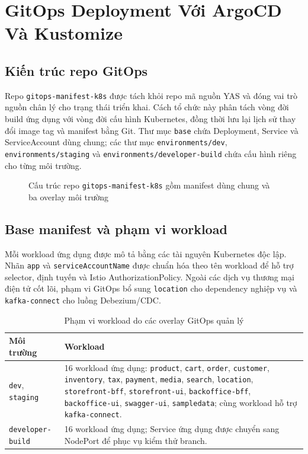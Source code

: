 \section{GitOps Deployment Với ArgoCD Và Kustomize}
\label{sec:gitops}

\subsection{Kiến trúc repo GitOps}

Repo \texttt{gitops-manifest-k8s} được tách khỏi repo mã nguồn YAS và đóng vai trò nguồn chân lý cho trạng thái triển khai. Cách tổ chức này phân tách vòng đời build ứng dụng với vòng đời cấu hình Kubernetes, đồng thời lưu lại lịch sử thay đổi image tag và manifest bằng Git. Thư mục \texttt{base} chứa Deployment, Service và ServiceAccount dùng chung; các thư mục \texttt{environments/dev}, \texttt{environments/staging} và \texttt{environments/developer-build} chứa cấu hình riêng cho từng môi trường.

\begin{figure}[H]
\centering
{}
\caption{Cấu trúc repo \texttt{gitops-manifest-k8s} gồm manifest dùng chung và ba overlay môi trường}
\end{figure}

\subsection{Base manifest và phạm vi workload}

Mỗi workload ứng dụng được mô tả bằng các tài nguyên Kubernetes độc lập. Nhãn \texttt{app} và \texttt{serviceAccountName} được chuẩn hóa theo tên workload để hỗ trợ selector, định tuyến và Istio AuthorizationPolicy. Ngoài các dịch vụ thương mại điện tử cốt lõi, phạm vi GitOps bổ sung \texttt{location} cho dependency nghiệp vụ và \texttt{kafka-connect} cho luồng Debezium/CDC.

\begin{table}[H]
\centering
\caption{Phạm vi workload do các overlay GitOps quản lý}
\begin{tabular}{|p{}|p{}|}
\hline
\textbf{Môi trường} & \textbf{Workload} \\
\hline
\texttt{dev}, \texttt{staging} &
16 workload ứng dụng: \texttt{product}, \texttt{cart}, \texttt{order},
\texttt{customer}, \texttt{inventory}, \texttt{tax}, \texttt{payment},
\texttt{media}, \texttt{search}, \texttt{location}, \texttt{storefront-bff},
\texttt{storefront-ui}, \texttt{backoffice-bff}, \texttt{backoffice-ui},
\texttt{swagger-ui}, \texttt{sampledata}; cùng workload hỗ trợ
\texttt{kafka-connect}. \\
\hline
\texttt{developer-build} &
16 workload ứng dụng; Service ứng dụng được chuyển sang NodePort để phục vụ
kiểm thử branch. \\
\hline
\end{tabular}
\end{table}

